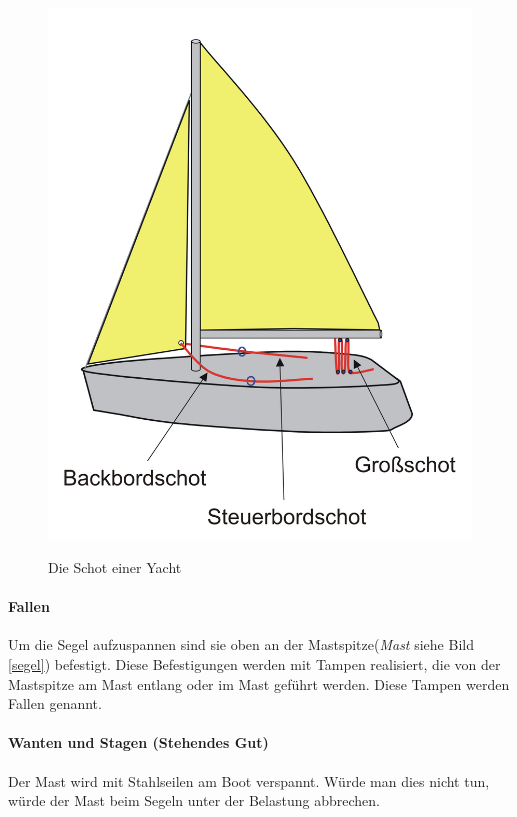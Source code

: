\documentclass[12pt]{article}
\begin{document}
\begin{figure}[h!]
\begin{center}
\label{schoten}
\includegraphics[scale=0.4]{bilder/schoten.png}
\end{center}
\caption{Die Schot einer Yacht}
\end{figure}

\paragraph{Fallen}
Um die Segel aufzuspannen sind sie oben an der Mastspitze(\textit{Mast} siehe Bild \ref{segel}) befestigt. Diese Befestigungen werden mit Tampen realisiert, die von der Mastspitze am Mast entlang oder im Mast geführt werden. Diese Tampen werden Fallen genannt.

\paragraph{Wanten und Stagen (Stehendes Gut)}
Der Mast wird mit Stahlseilen am Boot verspannt. Würde man dies nicht tun, würde der Mast beim Segeln unter der Belastung abbrechen.
\end{document}
